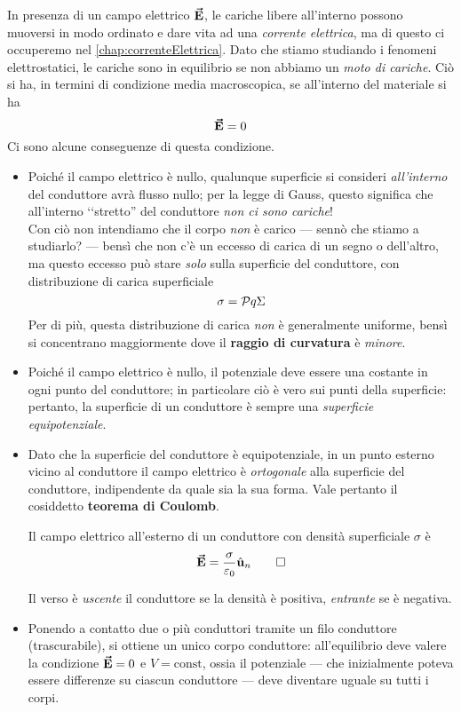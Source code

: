In presenza di un campo elettrico $\vb*{\va{E}}$, le cariche libere all'interno possono muoversi in modo ordinato e dare vita ad una \textit{corrente elettrica}, ma di questo ci occuperemo nel \autoref{chap:correnteElettrica}. Dato che stiamo studiando i fenomeni elettrostatici, le cariche sono in equilibrio se non abbiamo un \textit{moto di cariche}. Ciò si ha, in termini di condizione media macroscopica, se all'interno del materiale si ha
\begin{equation}
	\vb*{\va{E}}=0
\end{equation}
Ci sono alcune conseguenze di questa condizione.
\begin{itemize}
	\item Poiché il campo elettrico è nullo, qualunque superficie si consideri \textit{all'interno} del conduttore avrà flusso nullo; per la legge di Gauss, questo significa che all'interno ‘‘stretto'' del conduttore \textit{non ci sono cariche}!\\
	Con ciò non intendiamo che il corpo \textit{non} è carico --- sennò che stiamo a studiarlo? --- bensì che non c'è un eccesso di carica di un segno o dell'altro, ma questo eccesso può stare \textit{solo} sulla superficie del conduttore, con distribuzione di carica superficiale
	\begin{equation*}
		\sigma=\pv{q}{\Sigma}
	\end{equation*}
	Per di più, questa distribuzione di carica \textit{non} è generalmente uniforme, bensì si concentrano maggiormente dove il \textbf{raggio di curvatura} è \textit{minore}.
	\item Poiché il campo elettrico è nullo, il potenziale deve essere una costante in ogni punto del conduttore; in particolare ciò è vero sui punti della superficie: pertanto, la superficie di un conduttore è sempre una \textit{superficie equipotenziale}.
	\item Dato che la superficie del conduttore è equipotenziale, in un punto esterno vicino al conduttore il campo elettrico è \textit{ortogonale} alla superficie del conduttore, indipendente da quale sia la sua forma. Vale pertanto il cosiddetto \textbf{teorema di Coulomb}.
	\begin{theoremaqed}
		Il campo elettrico all'esterno di un conduttore con densità superficiale $\sigma$ è
		\begin{equation}
			\vb*{\va{E}}=\frac{\sigma}{\varepsilon_0}\hat{\mathbf{u}}_n\qedhere
		\end{equation}
	\end{theoremaqed}
	Il verso è \textit{uscente} il conduttore se la densità è positiva, \textit{entrante} se è negativa.
	\item Ponendo a contatto due o più conduttori tramite un filo conduttore (trascurabile), si ottiene un unico corpo conduttore: all'equilibrio deve valere la condizione $\vb*{\va{E}}=0$ e $V=\text{const}$, ossia il potenziale --- che inizialmente poteva essere differenze su ciascun conduttore --- deve diventare uguale su tutti i corpi.
	

\end{itemize}
